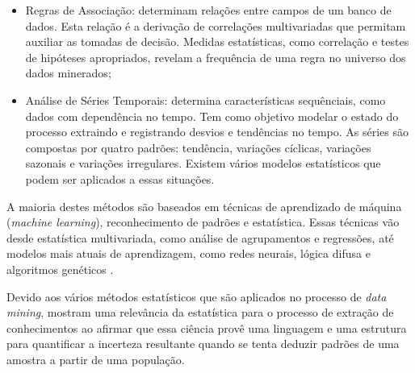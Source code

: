\begin{itemize}
	\item Regras de Associação: determinam relações entre campos de um banco de dados. Esta relação é a derivação de correlações multivariadas que permitam auxiliar as tomadas de decisão. Medidas estatísticas, como correlação e testes de hipóteses apropriados, revelam a frequência de uma regra no universo dos dados minerados;
	
	\item Análise de Séries Temporais: determina características sequênciais, como dados com dependência no tempo. Tem como objetivo modelar o estado do processo extraindo e registrando desvios e tendências no tempo. As séries são compostas por quatro padrões: tendência, variações cíclicas, variações sazonais e variações irregulares. Existem vários modelos estatísticos que podem ser aplicados a essas situações.
\end{itemize}

A maioria destes métodos são baseados em técnicas de aprendizado de máquina (\textit{machine learning}), reconhecimento de padrões e estatística. Essas técnicas vão desde estatística multivariada, como análise de agrupamentos e regressões, até modelos mais atuais de aprendizagem, como redes neurais, lógica difusa e algoritmos genéticos \cite{conceito-data-mining}.

Devido aos vários métodos estatísticos que são aplicados no processo de \textit{data mining},  mostram uma relevância da estatística para o processo de extração de conhecimentos ao afirmar que essa ciência provê uma linguagem e uma estrutura para quantificar a incerteza resultante quando se tenta deduzir padrões de uma amostra a partir de uma população.

